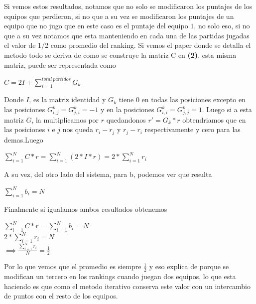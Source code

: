 Si vemos estos resultados, notamos que no solo se modificaron los puntajes de los equipos que perdieron, si no que a su vez se modificaron los puntajes de un equipo que no jugo que en este caso es el puntaje del equipo $1$, no solo eso, si no que a su vez notamos que esta manteniendo en cada una de las partidas jugadas el valor de 1/2 como promedio del ranking.
Si vemos el paper donde se detalla el metodo todo se deriva de como se construye la matriz C en \textbf{(2)}, esta misma matriz, puede ser representada como \\
\begin{center}
$C = 2I+\displaystyle\sum_{i=1}^{total\ partidos}G_k$
\end{center}

Donde $I$, es la matriz identidad y $G_k$ tiene 0 en todas las posiciones excepto en las posiciones $G_{i,j}^k = G_{j,i}^k = -1$ y en la posiciones $G_{i,i}^k = G_{j,j}^k = 1$. Luego si a esta matriz $G$, la multiplicamos por $r$ quedandonos $r'=G_k*r$  obtendriamos que en las posiciones $i$ e $j$ nos queda $r_i-r_j$ y $r_j-r_i$ respectivamente y cero para las demas.Luego 
 
\begin{center}
$\displaystyle\sum_{i=1}^{N}C*r = \displaystyle\sum_{i=1}^{N}(2*I*r) = 2*\displaystyle\sum_{i=1}^{N} r_i$
\end{center}

A su vez, del otro lado del sistema, para b, podemos ver que resulta

\begin{center}
$\displaystyle\sum_{i=1}^{N}b_i = N$
\end{center}

Finalmente si igualamos ambos resultados obtenemos

\begin{center}
$\displaystyle\sum_{i=1}^{N}C*r = \displaystyle\sum_{i=1}^{N}b_i = N$\\
$2*\displaystyle\sum_{i=1}^{N} r_i = N$\\
$\implies \frac{\displaystyle\sum_{i=1}^{N} r_i}{N} = \frac{1}{2}$\\
\end{center}

Por lo que vemos que el promedio es siempre $\frac{1}{2}$ y eso explica de porque se modifican un tercero en los rankings cuando juegan dos equipos, lo que esta haciendo es que como el metodo iterativo conserva este valor con un intercambio de puntos con el resto de los equipos.

